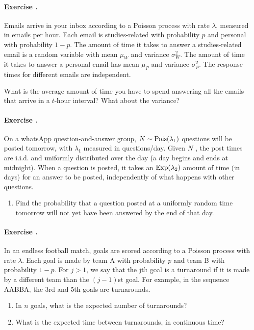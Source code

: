 \documentclass[twocolumn,12pt,a4paper]{article}
\newcounter{num}  %
\begin{document}
	
	
	\paragraph{Exercise \thenum.}
	Emails arrive in your inbox according to a Poisson process with rate $\lambda$, measured in emails per hour.
	Each email is studies-related with probability $p$ and personal with probability $1 - p$. 
	The amount of time it takes to answer a studies-related email is a random variable with mean $\mu_W$ and variance $\sigma_W^2$. 
	The amount of time it takes to answer a personal email has mean $\mu_P$ and variance $\sigma_P^2$.
	The response times for different emails are independent.
	
	What is the average amount of time you have to spend answering all the emails that arrive in a $t$-hour interval? What about the variance?
	
	
	
	\paragraph{Exercise \thenum.}
On a whatsApp question-and-answer group, $N \sim {\rm Pois}(\lambda_1)$ questions will be posted tomorrow, with $\lambda_1$ measured in questions/day. Given $N$ , the post times are i.i.d. and
uniformly distributed over the day (a day begins and ends at midnight). 
When a question is posted, it takes an ${\rm Exp}(\lambda_2)$ amount of time (in days) for an answer to be posted,
independently of what happens with other questions.
\begin{enumerate}
	\item Find the probability that a question posted at a uniformly random time tomorrow will not yet have been answered by the end of that day.
\end{enumerate}
	
	
	\paragraph{Exercise \thenum.}
	In an endless football match, goals are scored according to a Poisson process with rate $\lambda$.
	Each goal is made by team A with probability $p$ and team B with probability $1 - p$. 
	For $j > 1$, we say that the jth goal is a turnaround if it is made by a different team than the $(j - 1)$st goal. 
	For example, in the sequence AABBA, the 3rd and 5th goals are
	turnarounds.
	\begin{enumerate}
		\item In $n$ goals, what is the expected number of turnarounds?
		\item What is the expected time between turnarounds, in continuous time?
	\end{enumerate}
	
\end{document}
